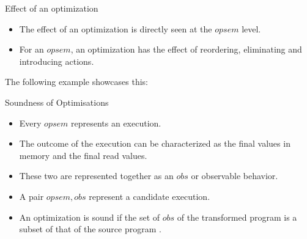 \documentclass[notes, xcolor=dvipsnames]{beamer}
\begin{document}
    \begin{frame}{Effect of an optimization}
        
        \begin{itemize}
            \item The effect of an optimization is directly seen at the $opsem$ level. 
            \item For an $opsem$, an optimization has the effect of reordering, eliminating and introducing actions. 
        \end{itemize}

        The following example showcases this:
        \begin{figure}
        \end{figure}

    \end{frame}

    \begin{frame}{Soundness of Optimisations}
        
        \begin{itemize}
            \item Every $opsem$ represents an execution.
            \item The outcome of the execution can be characterized as the final values in memory and the final read values.
            \item These two are represented together as an $obs$ or observable behavior. 
            \item A pair $opsem, obs$ represent a candidate execution.
            \item An optimization is sound if the set of $obs$ of the transformed program is a subset of that of the source program . 
        \end{itemize}
        
    \end{frame}
\end{document}
